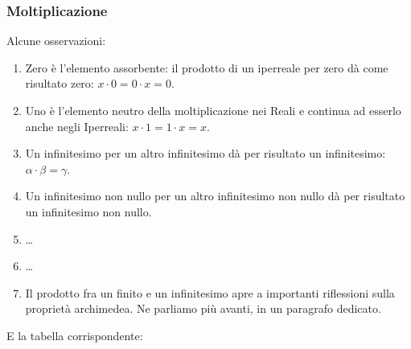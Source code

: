 \subsubsection{Moltiplicazione}
\label{subsec:insnum_moltiplicazione}

\noindent \begin{minipage}{.5\textwidth}
Alcune osservazioni:
\begin{enumerate} [noitemsep]
 \item Zero è l'elemento assorbente: il prodotto di un iperreale per zero
dà come risultato zero: $x \cdot 0=0 \cdot x=0$.
 \item Uno è l'elemento neutro della moltiplicazione nei Reali e continua ad 
esserlo anche negli Iperreali: $x \cdot 1=1 \cdot x=x$.
 \item Un infinitesimo per un altro infinitesimo dà per risultato un 
infinitesimo: $\alpha \cdot \beta=\gamma$.
 \item Un infinitesimo non nullo per un altro infinitesimo non nullo dà 
per risultato un infinitesimo non nullo.
 \item \dots
 \item \dots
 \item Il prodotto fra un finito e un infinitesimo apre a importanti 
riflessioni
sulla proprietà archimedea. Ne parliamo più avanti, in un paragrafo dedicato.
 \end{enumerate}
\end{minipage}
\hfill
\begin{minipage}{.45\textwidth}
E la tabella corrispondente:
\begin{center}
\renewcommand{\arraystretch}{.0}
\end{center}
\vspace{2mm}
\end{minipage}

